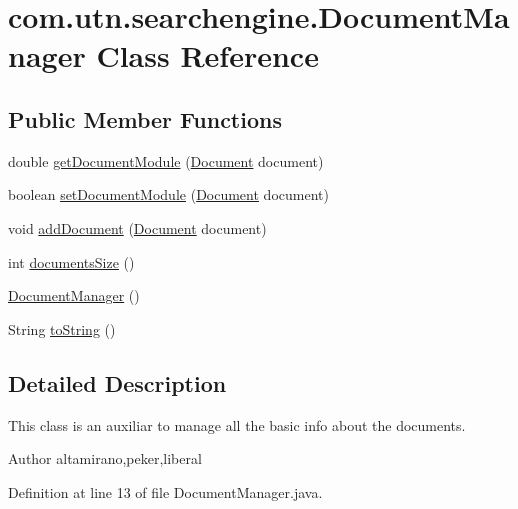 \hypertarget{classcom_1_1utn_1_1searchengine_1_1_document_manager}{\section{com.\-utn.\-searchengine.\-Document\-Manager \-Class \-Reference}
\label{classcom_1_1utn_1_1searchengine_1_1_document_manager}
}
\subsection*{\-Public \-Member \-Functions}
\begin{DoxyCompactItemize}
\item 
double \hyperlink{classcom_1_1utn_1_1searchengine_1_1_document_manager_a09fe544e27b965fcf796fe23c62bac63}{get\-Document\-Module} (\hyperlink{classcom_1_1utn_1_1searchengine_1_1_document}{\-Document} document)
\item 
boolean \hyperlink{classcom_1_1utn_1_1searchengine_1_1_document_manager_a482dbc878f08c89dc82d8b17d4ba689f}{set\-Document\-Module} (\hyperlink{classcom_1_1utn_1_1searchengine_1_1_document}{\-Document} document)
\item 
void \hyperlink{classcom_1_1utn_1_1searchengine_1_1_document_manager_a8295975e2a38a2efbd526921af105b79}{add\-Document} (\hyperlink{classcom_1_1utn_1_1searchengine_1_1_document}{\-Document} document)
\item 
int \hyperlink{classcom_1_1utn_1_1searchengine_1_1_document_manager_a416e11c09839b8f261bdb3e6b1036c89}{documents\-Size} ()
\item 
\hyperlink{classcom_1_1utn_1_1searchengine_1_1_document_manager_aa15e5b18fe4c94870484d03fbcabe247}{\-Document\-Manager} ()
\item 
\-String \hyperlink{classcom_1_1utn_1_1searchengine_1_1_document_manager_a98b4f2a2eca071ee2be5ef81c2d76098}{to\-String} ()
\end{DoxyCompactItemize}


\subsection{\-Detailed \-Description}
\-This class is an auxiliar to manage all the basic info about the documents. \begin{DoxyAuthor}{\-Author}
altamirano,peker,liberal 
\end{DoxyAuthor}


\-Definition at line 13 of file \-Document\-Manager.\-java.



